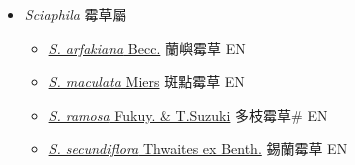 
  \begin{itemize}
 \item[] \textit{Sciaphila} 霉草屬
                    
  \begin{itemize}
        \item[] \href{http://www.theplantlist.org/tpl1.1/search?q=Sciaphila+arfakiana}{\textit{S. arfakiana} Becc.}   蘭嶼霉草 EN
        \item[] \href{http://www.theplantlist.org/tpl1.1/search?q=Sciaphila+maculata}{\textit{S. maculata} Miers}   斑點霉草 EN
        \item[] \href{http://www.theplantlist.org/tpl1.1/search?q=Sciaphila+ramosa}{\textit{S. ramosa} Fukuy. \& T.Suzuki}   多枝霉草\# EN
        \item[] \href{http://www.theplantlist.org/tpl1.1/search?q=Sciaphila+secundiflora}{\textit{S. secundiflora} Thwaites ex Benth.}   錫蘭霉草 EN
  \end{itemize}
  \end{itemize}
